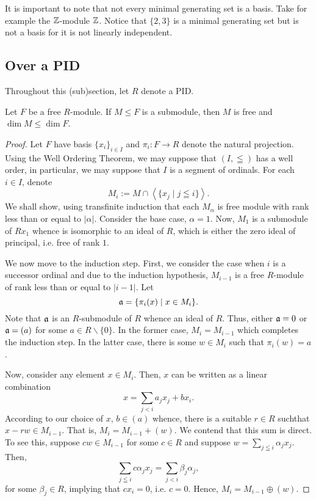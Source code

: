 It is important to note that not every minimal generating set is a basis. Take for example the $\mathbb{Z}$-module $\mathbb{Z}$. Notice that $\{2,3\}$ is a minimal generating set but is not a basis for it is not linearly independent.

\subsection{Over a PID}

Throughout this (sub)section, let $R$ denote a PID.

\begin{theorem}
    Let $F$ be a free $R$-module. If $M\le F$ is a submodule, then $M$ is free and $\dim M\le\dim F$.
\end{theorem}
\begin{proof}
    Let $F$ have basis $\{x_i\}_{i\in I}$ and $\pi_i: F\to R$ denote the natural projection. Using the Well Ordering Theorem, we may suppose that $(I,\leqq)$ has a well order, in particular, we may suppose that $I$ is a segment of ordinals. For each $i\in I$, denote
    \begin{equation*}
        M_i := M\cap\left\langle\{x_j\mid j\leqq i\}\right\rangle.
    \end{equation*}
    We shall show, using transfinite induction that each $M_\alpha$ is free module with rank less than or equal to $|\alpha|$. Consider the base case, $\alpha = 1$. Now, $M_1$ is a submodule of $Rx_1$ whence is isomorphic to an ideal of $R$, which is either the zero ideal of principal, i.e. free of rank $1$.

    We now move to the induction step. First, we consider the case when $i$ is a successor ordinal and due to the induction hypothesis, $M_{i - 1}$ is a free $R$-module of rank less than or equal to $|i - 1|$. Let 
    \begin{equation*}
        \mathfrak a = \{\pi_i(x)\mid x\in M_i\}.
    \end{equation*}
    Note that $\mathfrak a$ is an $R$-submodule of $R$ whence an ideal of $R$. Thus, either $\mathfrak a = 0$ or $\mathfrak a = (a)$ for some $a\in R\backslash\{0\}$. In the former case, $M_i = M_{i - 1}$ which completes the induction step. In the latter case, there is some $w\in M_i$ such that $\pi_i(w) = a$. 

    Now, consider any element $x\in M_i$. Then, $x$ can be written as a linear combination 
    \begin{equation*}
        x = \sum_{j < i}a_j x_j + bx_i.
    \end{equation*}
    According to our choice of $x$, $b\in (a)$ whence, there is a suitable $r\in R$ suchthat $x - rw\in M_{i - 1}$. That is, $M_i = M_{i - 1} + (w)$. We contend that this sum is direct. To see this, suppose $cw\in M_{i - 1}$ for some $c\in R$ and suppose $w = \sum_{j\leqq i}\alpha_j x_j$. Then, 
    \begin{equation*}
        \sum_{j\leqq i}c\alpha_j x_j = \sum_{j < i}\beta_j\alpha_j,
    \end{equation*}
    for some $\beta_j\in R$, implying that $cx_i = 0$, i.e. $c = 0$. Hence, $M_i = M_{i - 1}\oplus(w)$.


\end{proof}
